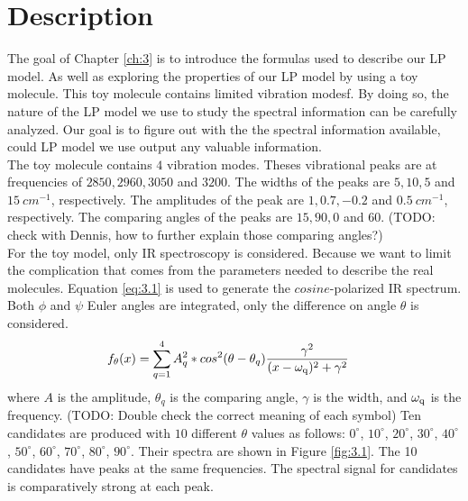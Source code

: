  \label{ch:3}

\section{Description}
The goal of Chapter \ref{ch:3} is to introduce the formulas used to describe our LP model. As well as exploring the properties of our LP model by using a toy molecule. This toy molecule contains limited vibration modesf. By doing so, the nature of the LP model we use to study the spectral information can be carefully analyzed. Our goal is to figure out with the the spectral information available, could LP model we use output any valuable information. \\

The toy molecule contains $4$ vibration modes. Theses vibrational peaks are at frequencies of $2850, 2960, 3050$ and $3200$. The widths of the peaks are $5, 10, 5$ and $15~cm^{-1}$, respectively. The amplitudes of the peak are $1, 0.7, -0.2$ and $0.5~cm^{-1}$, respectively. The comparing angles of the peaks are $15, 90, 0$ and $60$. (TODO: check with Dennis, how to further explain those comparing angles?)  \\

For the toy model, only IR spectroscopy is considered. Because we want to limit the complication that comes from the parameters needed to describe the real molecules. Equation \ref{eq:3.1} is used to generate the $cosine$-polarized IR spectrum. Both $\phi$ and $\psi$ Euler angles are integrated, only the difference on angle $\theta$ is considered. \\

\begin{eqnarray} \label{eq:3.1}
& f_{\theta}(x) = \displaystyle\sum^{4}_{q=1} A_q^2 * cos^2(\theta - \theta_q)\frac{\gamma^2}{(x- \omega_{\rm q})^2 + \gamma^2} 
\end{eqnarray}
where $A$ is the amplitude, $\theta_{q}$ is the comparing angle, $\gamma$ is the width, and $\omega_{\rm q}$ is the frequency. (TODO: Double check the correct meaning of each symbol) Ten candidates are produced with $10$ different $\theta$ values as follows: $0^{\circ}$, $10^{\circ}$, $20^{\circ}$, $30^{\circ}$, $40^{\circ}$, $50^{\circ}$, $60^{\circ}$, $70^{\circ}$, $80^{\circ}$, $90^{\circ}$. Their spectra are shown in Figure \ref{fig:3.1}. The 10 candidates have peaks at the same frequencies. The spectral signal for candidates is comparatively strong at each peak. \\

